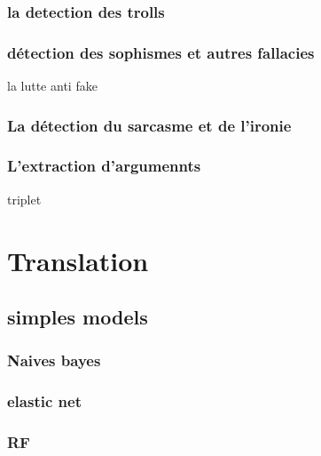 \documentclass[
]{book}
\begin{document}
\hypertarget{la-detection-des-trolls}{%
\subsection{la detection des trolls}\label{la-detection-des-trolls}}

\hypertarget{duxe9tection-des-sophismes-et-autres-fallacies}{%
\subsection{détection des sophismes et autres fallacies}\label{duxe9tection-des-sophismes-et-autres-fallacies}}

la lutte anti fake

\hypertarget{la-duxe9tection-du-sarcasme-et-de-lironie}{%
\subsection{La détection du sarcasme et de l'ironie}\label{la-duxe9tection-du-sarcasme-et-de-lironie}}

\hypertarget{lextraction-dargumennts}{%
\subsection{L'extraction d'argumennts}\label{lextraction-dargumennts}}

triplet

\hypertarget{translation}{%
\chapter{Translation}\label{translation}}

\hypertarget{simples-models-1}{%
\section{simples models}\label{simples-models-1}}

\hypertarget{naives-bayes-1}{%
\subsection{Naives bayes}\label{naives-bayes-1}}

\hypertarget{elastic-net-1}{%
\subsection{elastic net}\label{elastic-net-1}}

\hypertarget{rf-1}{%
\subsection{RF}\label{rf-1}}
\end{document}
